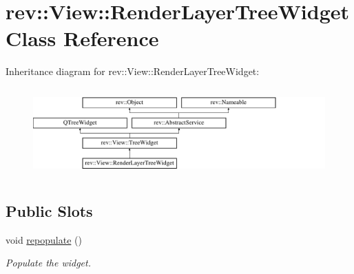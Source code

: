 \hypertarget{classrev_1_1_view_1_1_render_layer_tree_widget}{}\section{rev\+::View\+::Render\+Layer\+Tree\+Widget Class Reference}
\label{classrev_1_1_view_1_1_render_layer_tree_widget}
Inheritance diagram for rev\+::View\+::Render\+Layer\+Tree\+Widget\+:\begin{figure}[H]
\begin{center}
\leavevmode
\includegraphics[height=3.440860cm]{classrev_1_1_view_1_1_render_layer_tree_widget}
\end{center}
\end{figure}
\subsection*{Public Slots}
\begin{DoxyCompactItemize}
\item 
\mbox{\label{classrev_1_1_view_1_1_render_layer_tree_widget_a65422aa34fd163a5be5de56111a25536}} 
void \mbox{\hyperlink{classrev_1_1_view_1_1_render_layer_tree_widget_a65422aa34fd163a5be5de56111a25536}{repopulate}} ()
\begin{DoxyCompactList}\small\item\em Populate the widget. \end{DoxyCompactList}\end{DoxyCompactItemize}
